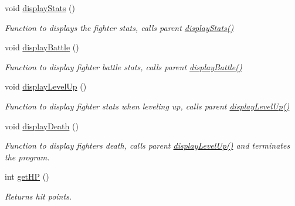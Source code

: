 \begin{DoxyCompactItemize}
\hypertarget{class_fighter_a9e63e29c35aaca0bc60ee46efe00cc62}{}\label{class_fighter_a9e63e29c35aaca0bc60ee46efe00cc62} 
void \hyperlink{class_fighter_a9e63e29c35aaca0bc60ee46efe00cc62}{display\+Stats} ()
\begin{DoxyCompactList}\small\item\em Function to displays the fighter stats, calls parent \hyperlink{class_fighter_a9e63e29c35aaca0bc60ee46efe00cc62}{display\+Stats()} \end{DoxyCompactList}\item 
\hypertarget{class_fighter_ad519375531d2f4ae2bc8896e3595d5f4}{}\label{class_fighter_ad519375531d2f4ae2bc8896e3595d5f4} 
void \hyperlink{class_fighter_ad519375531d2f4ae2bc8896e3595d5f4}{display\+Battle} ()
\begin{DoxyCompactList}\small\item\em Function to display fighter battle stats, calls parent \hyperlink{class_fighter_ad519375531d2f4ae2bc8896e3595d5f4}{display\+Battle()} \end{DoxyCompactList}\item 
\hypertarget{class_fighter_afa53e25a50772d86c5e929c6df1354ad}{}\label{class_fighter_afa53e25a50772d86c5e929c6df1354ad} 
void \hyperlink{class_fighter_afa53e25a50772d86c5e929c6df1354ad}{display\+Level\+Up} ()
\begin{DoxyCompactList}\small\item\em Function to display fighter stats when leveling up, calls parent \hyperlink{class_fighter_afa53e25a50772d86c5e929c6df1354ad}{display\+Level\+Up()} \end{DoxyCompactList}\item 
\hypertarget{class_fighter_a6a050f0b907517b09627fe16cea6e341}{}\label{class_fighter_a6a050f0b907517b09627fe16cea6e341} 
void \hyperlink{class_fighter_a6a050f0b907517b09627fe16cea6e341}{display\+Death} ()
\begin{DoxyCompactList}\small\item\em Function to display fighter\textquotesingle{}s death, calls parent \hyperlink{class_fighter_afa53e25a50772d86c5e929c6df1354ad}{display\+Level\+Up()} and terminates the program. \end{DoxyCompactList}\item 
\hypertarget{class_fighter_abdc380943224f1efa3d5c37abd0f8680}{}\label{class_fighter_abdc380943224f1efa3d5c37abd0f8680} 
int \hyperlink{class_fighter_abdc380943224f1efa3d5c37abd0f8680}{get\+HP} ()
\begin{DoxyCompactList}\small\item\em Returns hit points. \end{DoxyCompactList}\item 

\end{DoxyCompactItemize}
